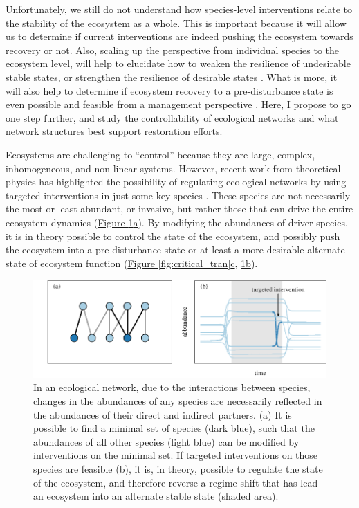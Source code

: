 \documentclass[a4paper]{article}
\begin{document}
Unfortunately, we still do not understand how species-level interventions relate to the stability of the ecosystem as a whole.
This is important because it will allow us to determine if current interventions are indeed pushing the ecosystem towards recovery or not.
Also, scaling up the perspective from individual species to the ecosystem level, will help to elucidate how to weaken the resilience of undesirable stable states, or strengthen the resilience of desirable states \autocite{Graham2013a}.
What is more, it will also help to determine if ecosystem recovery to a pre-disturbance state is even possible and feasible from a management perspective \autocite{Suding2009}.
Here, I propose to go one step further, and study the controllability of ecological networks and what network structures best support restoration efforts.

Ecosystems are challenging to ``control'' because they are large, complex, inhomogeneous, and non-linear systems.
However, recent work from theoretical physics has highlighted the possibility of regulating ecological networks by using targeted interventions in just some key species \autocite{Isbell2013, Cornelius2013}.
These species are not necessarily the most or least abundant, or invasive, but rather those that can drive the entire ecosystem dynamics \autocite{Liu2011} (\hyperref[fig:control_net]{Figure \ref{fig:control_net}a}).
By modifying the abundances of driver species, it is in theory possible to control the state of the ecosystem, and possibly push the ecosystem into a pre-disturbance state or at least a more desirable alternate state of ecosystem function (\hyperref[fig:critical_tran]{Figure \ref{fig:critical_tran}c}, \hyperref[fig:control_net]{\ref{fig:control_net}b}).

\begin{figure}
  \centering
  \includegraphics{control_net}
  \caption{
  \label{fig:control_net}
  In an ecological network, due to the interactions between species, changes in the abundances of any species are necessarily reflected in the abundances of their direct and indirect partners.
  (a) It is possible to find a minimal set of species (dark blue), such that the abundances of all other species (light blue) can be modified by interventions on the minimal set.
  If targeted interventions on those species are feasible (b), it is, in theory, possible to regulate the state of the ecosystem, and therefore reverse a regime shift that has lead an ecosystem into an alternate stable state (shaded area).
  }
\end{figure}
\end{document}

